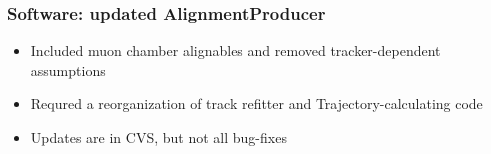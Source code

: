 \documentclass[compress]{beamer}
\begin{document}
\begin{frame}
  \frametitle{Software: updated AlignmentProducer}

  \begin{itemize}
    \item Included muon chamber alignables and removed
      tracker-dependent assumptions
    \item Requred a reorganization of track refitter and
      Trajectory-calculating code \hfill {}
  \end{itemize}

  \begin{center}
  \end{center}

  \vspace{-0.25 cm}
  \begin{itemize}
    \item Updates are in CVS, but not all bug-fixes
  \end{itemize}
\end{frame}
\end{document}
